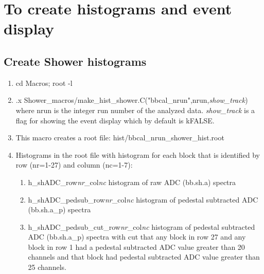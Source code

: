 \documentclass[]{article}
\begin{document}
\section{To create histograms and event display}
\subsection{Create Shower histograms}
\begin{enumerate}
	\item cd Macros; root -l
	\item .x Shower\_macros/make\_hist\_shower.C("bbcal\_nrun",nrun,{\it show\_track}) where nrun  is the integer run number of the analyzed data. {\it show\_track} is a flag for showing the event display which by default is kFALSE.
	\item This macro creates a root file: hist/bbcal\_nrun\_shower\_hist.root
	\item Histograms in the root file with histogram for each block that is identified by row (nr=1-27) and column (nc=1-7):
	\begin{enumerate}
		\item h\_shADC\_row{\it nr}\_col{\it nc} histogram of raw ADC (bb.sh.a) spectra
		\item h\_shADC\_pedsub\_row{\it nr}\_col{\it nc} histogram of pedestal subtracted ADC (bb.sh.a\_p) spectra
		\item h\_shADC\_pedsub\_cut\_row{\it nr}\_col{\it nc} histogram of pedestal subtracted ADC (bb.sh.a\_p) spectra with cut that any block in row 27 and any block in row 1 had a pedestal subtracted ADC value greater than 20 channels and that block had pedestal subtracted ADC value greater than 25 channels.
	\end{enumerate}
\end{enumerate}
\end{document}
